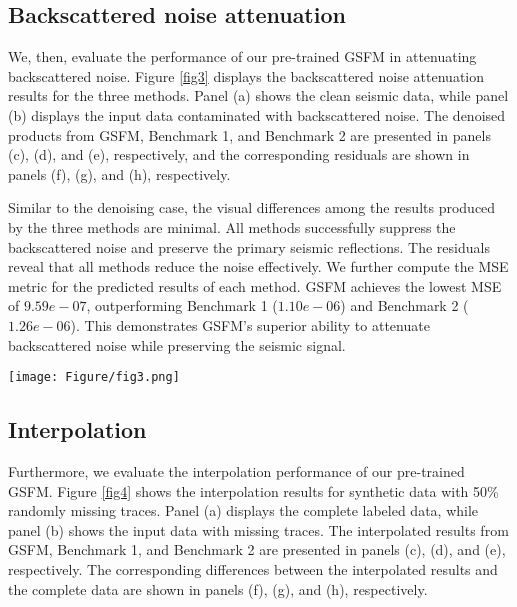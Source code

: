 \subsection{Backscattered noise attenuation}
We, then, evaluate the performance of our pre-trained GSFM in attenuating backscattered noise. Figure \ref{fig3} displays the backscattered noise attenuation results for the three methods. Panel (a) shows the clean seismic data, while panel (b) displays the input data contaminated with backscattered noise. The denoised products from GSFM, Benchmark 1, and Benchmark 2 are presented in panels (c), (d), and (e), respectively, and the corresponding residuals are shown in panels (f), (g), and (h), respectively. 

Similar to the denoising case, the visual differences among the results produced by the three methods are minimal. All methods successfully suppress the backscattered noise and preserve the primary seismic reflections. The residuals reveal that all methods reduce the noise effectively. We further compute the MSE metric for the predicted results of each method. GSFM achieves the lowest MSE of $9.59e-07$, outperforming Benchmark 1 ($1.10e-06$) and Benchmark 2 ($1.26e-06$). This demonstrates GSFM's superior ability to attenuate backscattered noise while preserving the seismic signal.

\begin{figure*}[htbp]
\centering
\texttt{[image: Figure/fig3.png]}
\caption{Backscattered noise attenuation performance comparison between our pre-trained DSFM and two benchmarks on synthetic data. (a) The clean and (b) noisy data contaminated with backscattered noise. The denoised products from (c) our GSFM, (d) Benchmark 1, and (e) Benchmark 2. f, g, and h are the corresponding difference between the denoised results and the clean data. }
\label{fig3}
\end{figure*}

\subsection{Interpolation}
Furthermore, we evaluate the interpolation performance of our pre-trained GSFM. Figure \ref{fig4} shows the interpolation results for synthetic data with 50\% randomly missing traces. Panel (a) displays the complete labeled data, while panel (b) shows the input data with missing traces. The interpolated results from GSFM, Benchmark 1, and Benchmark 2 are presented in panels (c), (d), and (e), respectively. The corresponding differences between the interpolated results and the complete data are shown in panels (f), (g), and (h), respectively. 

